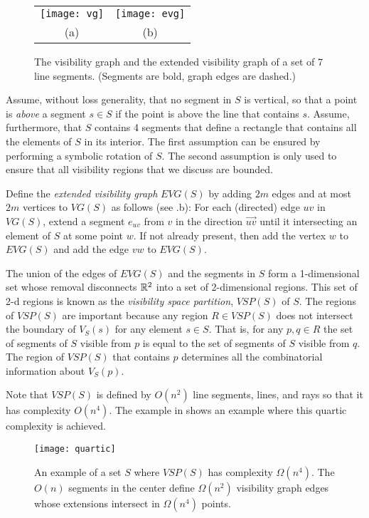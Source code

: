\documentclass{patmorin}
\newcommand{\VG}{\mathit{VG}}
\newcommand{\EVG}{\mathit{EVG}}
\newcommand{\VSP}{\mathit{VSP}}
\begin{document}
\begin{figure}
  \begin{center}
    \begin{tabular}{cc}
    \texttt{[image: vg]} & \texttt{[image: evg]} \\
    (a) & (b)
    \end{tabular}
  \end{center}
  \caption{The visibility graph and the extended visibility graph of a set
       of 7 line segments. (Segments are bold, graph edges are dashed.)}
\end{figure}

Assume, without loss generality, that no segment in $S$ is vertical, so
that a point is \emph{above} a segment $s\in S$ if the point is above
the line that contains $s$.  Assume, furthermore, that $S$ contains 4
segments that define a rectangle that contains all the elements of $S$
in its interior.  The first assumption can be ensured by performing a
symbolic rotation of $S$.  The second assumption is only used to ensure
that all visibility regions that we discuss are bounded.

Define the \emph{extended visibility graph} $\EVG(S)$ by adding $2m$ edges
and at most $2m$ vertices to $\VG(S)$ as follows (see .b):
For each (directed) edge $uv$ in $\VG(S)$, extend a segment $e_{uv}$
from $v$ in the direction $\overrightarrow{uv}$ until it intersecting
an element of $S$ at some point $w$.  If not already present, then add
the vertex $w$ to $\EVG(S)$ and add the edge $vw$ to $\EVG(S)$.

The union of the edges of $\EVG(S)$ and the segments in $S$ form a
1-dimensional set whose removal disconnects $\mathbb{R}^2$ into a set of
2-dimensional regions.  This set of 2-d regions is known as the
\emph{visibility space partition}, $\VSP(S)$ of $S$.  The regions
of $\VSP(S)$ are important because any region $R\in\VSP(S)$ does not
intersect the boundary of $V_S(s)$ for any element $s\in S$. That is,
for any $p,q\in R$ the set of segments of $S$ visible from $p$ is equal to
the set of segments of $S$ visible from $q$.  The region of $\VSP(S)$ that
contains $p$ determines all the combinatorial information about $V_S(p)$.

Note that $\VSP(S)$ is defined by $O(n^2)$ line segments, lines, and rays
so that it has complexity $O(n^4)$.  The example in  shows
an example where this quartic complexity is achieved.

\begin{figure}
  \begin{center}
    \texttt{[image: quartic]}
  \end{center}
  \caption{An example of a set $S$ where $\VSP(S)$ has complexity
$\Omega(n^4)$.  The $O(n)$ segments in the center define $\Omega(n^2)$
visibility graph edges whose extensions intersect in $\Omega(n^4)$ points.}
\end{figure}
\end{document}
